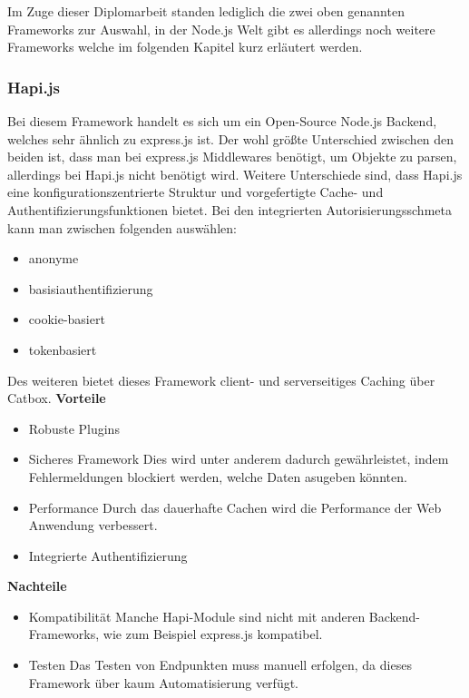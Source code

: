Im Zuge dieser Diplomarbeit standen lediglich die zwei oben genannten Frameworks zur Auswahl, in der Node.js Welt gibt es allerdings noch weitere Frameworks welche im folgenden Kapitel kurz erläutert werden.

\subsubsection{Hapi.js}
Bei diesem Framework handelt es sich um ein Open-Source Node.js Backend, welches sehr ähnlich zu express.js ist. Der wohl größte Unterschied zwischen den beiden ist, dass man bei express.js Middlewares benötigt, um Objekte zu parsen, allerdings bei Hapi.js nicht benötigt wird. Weitere Unterschiede sind, dass Hapi.js eine konfigurationszentrierte Struktur und vorgefertigte Cache- und Authentifizierungsfunktionen bietet. Bei den integrierten Autorisierungsschmeta kann man zwischen folgenden auswählen:
\begin{itemize}
    \item anonyme
    \item basisiauthentifizierung
    \item cookie-basiert
    \item tokenbasiert
\end{itemize}
Des weiteren bietet dieses Framework client- und serverseitiges Caching über Catbox.
\newline
\textbf{Vorteile}
\begin{itemize}
    \item Robuste Plugins
    \item Sicheres Framework
        \newline
        Dies wird unter anderem dadurch gewährleistet, indem Fehlermeldungen blockiert werden, welche Daten asugeben könnten.
    \item Performance
        \newline
        Durch das dauerhafte Cachen wird die Performance der Web Anwendung verbessert.
    \item Integrierte Authentifizierung
\end{itemize}

\textbf{Nachteile}
\begin{itemize}
    \item Kompatibilität
        \newline
        Manche Hapi-Module sind nicht mit anderen Backend-Frameworks, wie zum Beispiel express.js kompatibel.
    \item Testen
        \newline
        Das Testen von Endpunkten muss manuell erfolgen, da dieses Framework über kaum Automatisierung verfügt.
\end{itemize}
\cite{backend_hapi}


